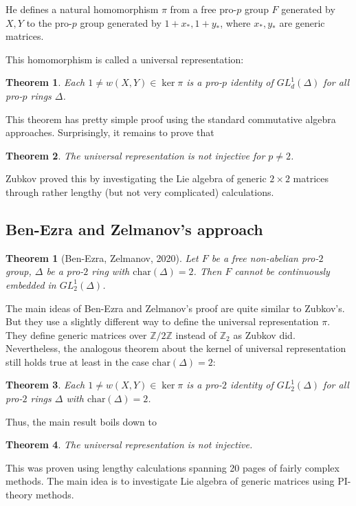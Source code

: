 \documentclass[12pt,a4paper]{article}
\newtheorem{theorem}{Theorem}[subsection]
\newtheorem*{theorem*}{Theorem}
\begin{document}
    He defines a natural homomorphism $\pi$ from a free pro-$p$ group $F$ generated by $X, Y$ to the pro-$p$ group generated by
    $1 + x_*, 1 + y_*$, where $x_*, y_*$ are generic matrices.

    This homomorphism is called a universal representation:
    \vskip 0.1in\noindent
    \begin{theorem}
        Each $1\neq w(X, Y) \in \ker \pi$ is a pro-$p$ identity of $GL^1_d(\Delta)$ for all pro-$p$ rings $\Delta$.
    \end{theorem}
    \vskip 0.1in\noindent
    This theorem has pretty simple proof using the standard commutative algebra approaches.
    Surprisingly, it remains to prove that
    \vskip 0.1in\noindent
    \begin{theorem}
        The universal representation is not injective for $p\neq 2$.
    \end{theorem}
    \vskip 0.1in\noindent
    Zubkov proved this by investigating the Lie algebra of generic $2\times 2$ matrices through rather lengthy (but not very complicated) calculations.

    \subsection{Ben-Ezra and Zelmanov's approach}
    \begin{theorem*}[Ben-Ezra, Zelmanov, 2020]
        Let $F$ be a free non-abelian pro-$2$ group, $\Delta$ be a pro-$2$ ring with $\mathrm{char}(\Delta)=2$.
        Then $F$ cannot be continuously embedded in $GL^1_2(\Delta)$.
    \end{theorem*}
    \vskip 0.1in\noindent

    The main ideas of Ben-Ezra and Zelmanov's proof are quite similar to Zubkov's.
    But they use a slightly different way to define the universal representation $\pi$.
    They define generic matrices over $\mathbb{Z}/2\mathbb{Z}$ instead of $\mathbb{Z}_2$ as Zubkov did.
    Nevertheless, the analogous theorem about the kernel of universal representation still holds true at least in the case $\mathrm{char}(\Delta)=2$:
    \vskip 0.1in\noindent
    \begin{theorem}
        Each $1\neq w(X, Y) \in \ker \pi$ is a pro-$2$ identity of $GL^1_2(\Delta)$ for all pro-$2$ rings $\Delta$ with $\mathrm{char}(\Delta)=2$.
    \end{theorem}
    \vskip 0.1in\noindent

    Thus, the main result boils down to
    \vskip 0.1in\noindent
    \begin{theorem}
        The universal representation is not injective.
    \end{theorem}
    \vskip 0.1in\noindent
    This was proven using lengthy calculations spanning 20 pages of fairly complex methods.
    The main idea is to investigate Lie algebra of generic matrices using PI-theory methods.
\end{document}
